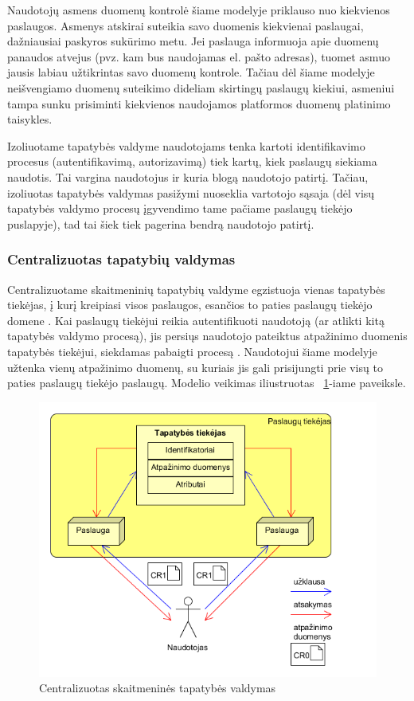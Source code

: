 Naudotojų asmens duomenų kontrolė šiame modelyje priklauso nuo kiekvienos paslaugos. Asmenys atskirai suteikia savo duomenis
kiekvienai paslaugai, dažniausiai paskyros sukūrimo metu. Jei paslauga informuoja apie duomenų panaudos atvejus (pvz. kam bus naudojamas
el. pašto adresas), tuomet asmuo jausis labiau užtikrintas savo duomenų kontrole. Tačiau dėl šiame modelyje neišvengiamo duomenų suteikimo
dideliam skirtingų paslaugų kiekiui, asmeniui tampa sunku prisiminti kiekvienos naudojamos platformos duomenų platinimo taisykles.

Izoliuotame tapatybės valdyme naudotojams tenka kartoti identifikavimo procesus (autentifikavimą, autorizavimą) tiek kartų, kiek paslaugų siekiama
naudotis. Tai vargina naudotojus ir kuria blogą naudotojo patirtį. Tačiau, izoliuotas tapatybės valdymas pasižymi nuoseklia vartotojo sąsaja (dėl 
visų tapatybės valdymo procesų įgyvendimo tame pačiame paslaugų tiekėjo puslapyje), tad tai šiek tiek pagerina bendrą naudotojo patirtį.

\subsubsection{Centralizuotas tapatybių valdymas}

Centralizuotame skaitmeninių tapatybių valdyme egzistuoja vienas tapatybės tiekėjas, į kurį kreipiasi visos paslaugos,
esančios to paties paslaugų tiekėjo domene \cite{Josang2005}. Kai paslaugų tiekėjui
reikia autentifikuoti naudotoją (ar atlikti kitą tapatybės valdymo procesą), jis persiųs naudotojo pateiktus atpažinimo duomenis tapatybės tiekėjui,
siekdamas pabaigti procesą \cite{Cao2010}. Naudotojui šiame modelyje užtenka vienų atpažinimo duomenų, su kuriais jis gali prisijungti prie visų to paties
paslaugų tiekėjo paslaugų. Modelio veikimas iliustruotas \hypertarget{fig:centralisedModel}{~\ref{fig:centralisedModel}}-iame paveiksle.

\begin{figure}[H]
    \centering
    \includegraphics[scale=0.8]{img/centralizedModel}
    \caption{Centralizuotas skaitmeninės tapatybės valdymas \cite{Cao2010}}
    \label{fig:centralisedModel}
\end{figure}

